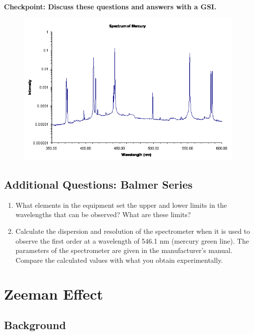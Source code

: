 \documentclass{../lab}
\begin{document}
\textbf{Checkpoint: Discuss these questions and answers with a GSI.}

\begin{figure}[h]
    \centering
    \href{http://experimentationlab.berkeley.edu/sites/default/files/images/Atmimage015.gif}{\includegraphics[width=0.8\linewidth]{images/Atmimage015.png}}
    \caption{}
    \label{fig:Atmimage015}
\end{figure}

\subsection{Additional Questions: Balmer Series}

\begin{enumerate}
    \item What elements in the equipment set the upper and lower limits in the wavelengths that can be observed? What are these limits?

    \item Calculate the dispersion and resolution of the spectrometer when it is used to observe the first order at a wavelength of 546.1 nm (mercury green line). The parameters of the spectrometer are given in the manufacturer's manual. Compare the calculated values with what you obtain experimentally.

\end{enumerate}

\section{Zeeman Effect}

\subsection{Background}
\end{document}
